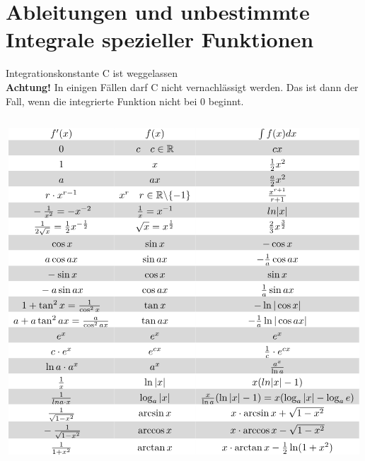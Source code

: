 \section{Ableitungen und unbestimmte Integrale spezieller Funktionen}
\label{sec:ablintspez}
Integrationskonstante C ist weggelassen\\
\textbf{Achtung!} In einigen Fällen darf C nicht vernachlässigt werden. 
Das ist dann der Fall, wenn die integrierte Funktion nicht bei 0 beginnt. \\\\
\footnotesize
\[ \begin{matrix}
\rowcolor{white} f'(x) & f(x) & \int f(x) dx\\
\rowcolor{lgray} \rule{0pt}{12pt}0 & c \quad c \in \mathbb{R} & cx \\
\rowcolor{white} \rule{0pt}{12pt}1 & x & \frac{1}{2}x^2 \\
\rowcolor{lgray} \rule{0pt}{12pt}a & ax & \frac{a}{2}x^2 \\
\rowcolor{white} \rule{0pt}{12pt}r \cdot x^{r-1} & x^r 
\quad r \in \mathbb{R} \backslash \{-1\} & \frac{x^{r+1}}{r+1} \\
\rowcolor{lgray} \rule{0pt}{12pt}-\frac{1}{x^2} = -x^{-2} 
& \frac{1}{x} = x^{-1} & ln{|x|} \\
\rowcolor{white} \rule{0pt}{12pt}\frac{1}{2\sqrt{x}} 
= \frac{1}{2}x^{-\frac{1}{2}} & \sqrt{x} = x^{\frac{1}{2}} 
& \frac{2}{3}x^{\frac{3}{2}} \\
\rowcolor{lgray} \rule{0pt}{12pt}\cos x & \sin x & -\cos x \\
\rowcolor{white} \rule{0pt}{12pt}a \cos ax & \sin ax & -\frac{1}{a} \cos ax \\
\rowcolor{lgray} \rule{0pt}{12pt}-\sin x & \cos x & \sin x \\
\rowcolor{white} \rule{0pt}{12pt}-a\sin ax & \cos ax & \frac{1}{a}\sin ax \\
\rowcolor{lgray} \rule{0pt}{12pt}1 + \tan^2 x = \frac{1}{\cos^2 x} & \tan x 
& -\ln |\cos x| \\
\rowcolor{white} \rule{0pt}{12pt}a + a \tan^2 ax = \frac{a}{\cos^2 ax} & \tan ax 
& -\frac{1}{a}\ln |\cos ax| \\
\rowcolor{lgray} \rule{0pt}{12pt}e^x & e^x & e^x \\
\rowcolor{white} \rule{0pt}{12pt}c \cdot e^x & e^{cx} 
& \frac{1}{c} \cdot e^{cx} \\
\rowcolor{lgray} \rule{0pt}{12pt}\ln a \cdot a^x & a^x & \frac{a^x}{\ln a} \\
\rowcolor{white} \rule{0pt}{12pt}\frac{1}{x} & \ln |x| & x(ln |x| - 1) \\
\rowcolor{lgray} \rule{0pt}{12pt}\frac{1}{ln a \cdot x} & \log_a |x| 
& \frac{x}{\ln a}(\ln |x| - 1) = x(\log_a |x| - \log_a e) \\
\rowcolor{white} \rule{0pt}{12pt}\frac{1}{\sqrt{1 - x^2}} & \arcsin x 
& x \cdot \arcsin x + \sqrt{1 - x^2} \\
\rowcolor{lgray} \rule{0pt}{12pt}-\frac{1}{\sqrt{1 - x^2}} & \arccos x 
& x \cdot \arccos x - \sqrt{1 - x^2} \\
\rowcolor{white} \rule{0pt}{12pt}\frac{1}{1 + x^2} & \arctan x 
& x \cdot \arctan x - \frac{1}{2}\ln(1 + x^2) \\
\end{matrix} \]
\normalsize

